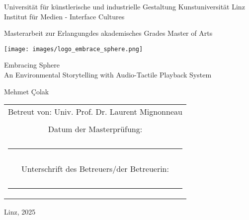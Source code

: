 \begin{titlepage}
    \centering

    {\large
    Universität für künstlerische und industrielle Gestaltung Kunstuniversität Linz\\
    Institut für Medien - Interface Cultures}
    
    \vspace{0.2cm}

    {\large Masterarbeit zur Erlangungdes akademisches Grades Master of Arts\\}

    \vspace{0.5cm}

    \texttt{[image: images/logo\_embrace\_sphere.png]}
    
    {\Huge Embracing Sphere\\[0.5cm]
    \Large An Environmental Storytelling with Audio-Tactile Playback System}

    \vspace{0.5cm}

    {\LARGE Mehmet Çolak}

    \vfill

    \begin{tabular}{c}
        \Large Betreut von: Univ. Prof. Dr. Laurent Mignonneau \\ \\
        \large Datum der Masterprüfung: \\ \\
        \rule{3cm}{0.1pt} \\ \\
        \large Unterschrift des Betreuers/der Betreuerin: \\ \\
        \rule{3cm}{0.1pt} \\
    \end{tabular}
    
    \vspace{1cm}
    
    {\small Linz, 2025}

\end{titlepage}